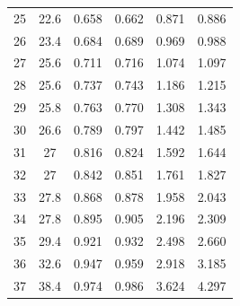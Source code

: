 \begin{table}[H]
\begin{tabular}{cccccc}
    25         & 22.6                        & 0.658                      & 0.662                       & 0.871                   & 0.886                   \\
    26         & 23.4                        & 0.684                      & 0.689                       & 0.969                   & 0.988                   \\
    27         & 25.6                        & 0.711                      & 0.716                       & 1.074                   & 1.097                   \\
    28         & 25.6                        & 0.737                      & 0.743                       & 1.186                   & 1.215                   \\
    29         & 25.8                        & 0.763                      & 0.770                       & 1.308                   & 1.343                   \\
    30         & 26.6                        & 0.789                      & 0.797                       & 1.442                   & 1.485                   \\
    31         & 27                          & 0.816                      & 0.824                       & 1.592                   & 1.644                   \\
    32         & 27                          & 0.842                      & 0.851                       & 1.761                   & 1.827                   \\
    33         & 27.8                        & 0.868                      & 0.878                       & 1.958                   & 2.043                   \\
    34         & 27.8                        & 0.895                      & 0.905                       & 2.196                   & 2.309                   \\
    35         & 29.4                        & 0.921                      & 0.932                       & 2.498                   & 2.660                   \\
    36         & 32.6                        & 0.947                      & 0.959                       & 2.918                   & 3.185                   \\
    37         & 38.4                        & 0.974                      & 0.986                       & 3.624                   & 4.297         \\
    \bottomrule         
    \end{tabular}
    \label{table:prec_05ore}
    \end{table}


